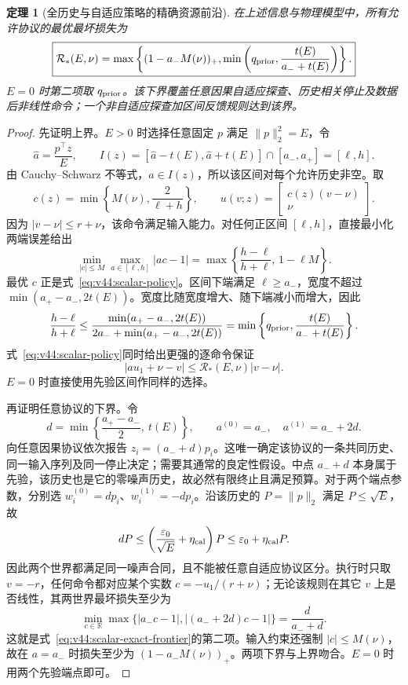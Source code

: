 \documentclass[11pt,a4paper]{article}
\numberwithin{equation}{section}
\newtheorem{theorem}{定理}[section]
\theoremstyle{definition}
\begin{document}
\begin{theorem}[全历史与自适应策略的精确资源前沿]
\label{thm:v44:scalar-exact}
在上述信息与物理模型中，所有允许协议的最优最坏损失为
\begin{equation}
 \boxed{\mathcal R_*(E,\nu)
 =\max\left\{(1-a_-M(\nu))_+,
 \min\left(q_{\rm prior},\frac{t(E)}{a_-+t(E)}\right)\right\}.}
 \label{eq:v44:scalar-exact-frontier}
\end{equation}
$E=0$ 时第二项取 $q_{\rm prior}$。该下界覆盖任意因果自适应探查、历史相关停止及数据后非线性命令；一个非自适应探查加区间反馈规则达到该界。
\end{theorem}

\begin{proof}
先证明上界。$E>0$ 时选择任意固定 $p$ 满足 $\|p\|_2^2=E$，令
\[
 \widehat a=\frac{p^\top z}{E},\qquad
 I(z)=[\widehat a-t(E),\widehat a+t(E)]\cap[a_-,a_+]
 =[\ell,h].
\]
由 Cauchy--Schwarz 不等式，$a\in I(z)$，所以该区间对每个允许历史非空。取
\begin{equation}
 c(z)=\min\left\{M(\nu),\frac2{\ell+h}\right\},
 \qquad u(v;z)=\begin{bmatrix}c(z)(v-\nu)\\\nu\end{bmatrix}.
 \label{eq:v44:scalar-policy}
\end{equation}
因为 $|v-\nu|\le r+\nu$，该命令满足输入能力。对任何正区间 $[\ell,h]$，直接最小化两端误差给出
\[
 \min_{|c|\le M}\max_{a\in[\ell,h]}|ac-1|
 =\max\left\{\frac{h-\ell}{h+\ell},\,1-\ell M\right\}.
\]
最优 $c$ 正是式~\eqref{eq:v44:scalar-policy}。区间下端满足 $\ell\ge a_-$，宽度不超过 $\min(a_+-a_-,2t(E))$。宽度比随宽度增大、随下端减小而增大，因此
\[
 \frac{h-\ell}{h+\ell}
 \le\frac{\min(a_+-a_-,2t(E))}{2a_-+\min(a_+-a_-,2t(E))}
 =\min\left\{q_{\rm prior},\frac{t(E)}{a_-+t(E)}\right\}.
\]
式~\eqref{eq:v44:scalar-policy}同时给出更强的逐命令保证
\[
 |a u_1+\nu-v|\le \mathcal R_*(E,\nu)|v-\nu|.
\]
$E=0$ 时直接使用先验区间作同样的选择。

再证明任意协议的下界。令
\[
 d=\min\left\{\frac{a_+-a_-}{2},\ t(E)\right\},\qquad
 a^{(0)}=a_-,\quad a^{(1)}=a_-+2d.
\]
向任意因果协议依次报告 $z_i=(a_-+d)p_i$。这唯一确定该协议的一条共同历史、同一输入序列及同一停止决定；需要其通常的良定性假设。中点 $a_-+d$ 本身属于先验，该历史也是它的零噪声历史，故必然有限终止且满足预算。对于两个端点参数，分别选 $w_i^{(0)}=d p_i$、$w_i^{(1)}=-d p_i$。沿该历史的 $P=\|p\|_2$ 满足 $P\le\sqrt E$，故
\[
 dP\le\left(\frac{\varepsilon_0}{\sqrt E}+\eta_{\rm cal}\right)P
 \le\varepsilon_0+\eta_{\rm cal}P.
\]
因此两个世界都满足同一噪声合同，且不能被任意自适应协议区分。执行时只取 $v=-r$，任何命令都对应某个实数 $c=-u_1/(r+\nu)$；无论该规则在其它 $v$ 上是否线性，其两世界最坏损失至少为
\[
 \min_{c\in\mathbb R}\max\{|a_-c-1|,|(a_-+2d)c-1|\}
 =\frac d{a_-+d}.
\]
这就是式~\eqref{eq:v44:scalar-exact-frontier}的第二项。输入约束还强制 $|c|\le M(\nu)$，故在 $a=a_-$ 时损失至少为 $(1-a_-M(\nu))_+$。两项下界与上界吻合。$E=0$ 时用两个先验端点即可。
\end{proof}
\end{document}

